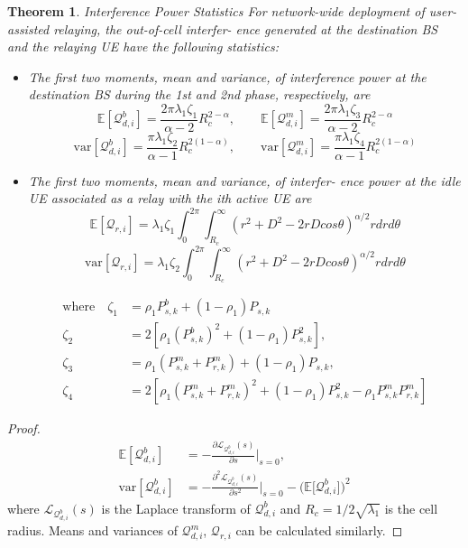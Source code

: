 \documentclass[titlepage]{article}
\newtheorem{thm}{Theorem}
\begin{document}
\begin{thm}{Interference Power Statistics} \label{thm:thm2}
For network-wide
deployment of user-assisted relaying, the out-of-cell interfer-
ence generated at the destination BS and the relaying UE have
the following statistics:

\begin{itemize}
\item[i.] 
The first two moments, mean and variance, of interference
power at the destination BS during the 1st and 2nd phase,
respectively, are
\begin{equation}
\mathbb{E}[\mathcal{Q}_{d,i}^b] = \frac{2\pi\lambda_1\zeta_1}{\alpha-2}R_c^{2-\alpha}, \qquad \mathbb{E}[\mathcal{Q}_{d,i}^m] = \frac{2\pi\lambda_1\zeta_3}{\alpha-2}R_c^{2-\alpha}
\end{equation}
\begin{equation}
\text{var}[\mathcal{Q}_{d,i}^b] = \frac{\pi\lambda_1\zeta_2}{\alpha-1}R_c^{2(1-\alpha)}, \qquad \text{var}[\mathcal{Q}_{d,i}^m] = \frac{\pi\lambda_1\zeta_4}{\alpha-1}R_c^{2(1-\alpha)}
\end{equation}

\item[ii.]
The first two moments, mean and variance, of interfer-
ence power at the idle UE associated as a relay with the ith
active UE are
\begin{equation}
\mathbb{E}[\mathcal{Q}_{r,i}] = \lambda_1\zeta_1 \int_0^{2\pi}\int_{R_c}^\infty (r^2+D^2-2rDcos\theta)^{\alpha/2}rdrd\theta
\end{equation}
\begin{equation}
\text{var}[\mathcal{Q}_{r,i}] = \lambda_1\zeta_2 \int_0^{2\pi}\int_{R_c}^\infty (r^2+D^2-2rDcos\theta)^{\alpha/2}rdrd\theta
\end{equation}

\begin{align} \label{eq:zeta1}
\text{where} \quad  \zeta_1 &= \rho_1 P_{s,k}^b +(1-\rho_1)P_{s,k} \\
                \zeta_2 &= 2[\rho_1(P_{s,k}^b)^2 + (1-\rho_1)P_{s,k}^2],\\
                \zeta_3 &= \rho_1 (P_{s,k}^m+P_{r,k}^m) +(1-\rho_1)P_{s,k}, \\
                \zeta_4 &= 2[\rho_1(P_{s,k}^m+P_{r,k}^m)^2 + (1-\rho_1)P_{s,k}^2 -\rho_1P_{s,k}^mP_{r,k}^m] \label{eq:zeta4}
\end{align}
\end{itemize}
\end{thm}
\begin{proof}
\begin{align*}
\mathbb{E}[\mathcal{Q}_{d,i}^b] &= -\frac{\partial\mathcal{L}_{\mathcal{Q}_{d,i}^b}(s)}{\partial s}\bigg\rvert_{s=0}, \\
\text{var}[\mathcal{Q}_{d,i}^b] &= -\frac{\partial^2\mathcal{L}_{\mathcal{Q}_{d,i}^b}(s)}{\partial s^2}\bigg\rvert_{s=0} - \Big(\mathbb{E}\big[\mathcal{Q}_{d,i}^b \big] \Big)^2
\end{align*}
where $\mathcal{L}_{\mathcal{Q}_{d,i}^b}(s)$ is the Laplace transform of $\mathcal{Q}_{d,i}^b$ and $R_c = 1/2\sqrt{\lambda_1}$ is the cell radius. Means and variances of $\mathcal{Q}_{d,i}^m$, $\mathcal{Q}_{r,i}$ can be calculated similarly.
\end{proof}
\end{document}
